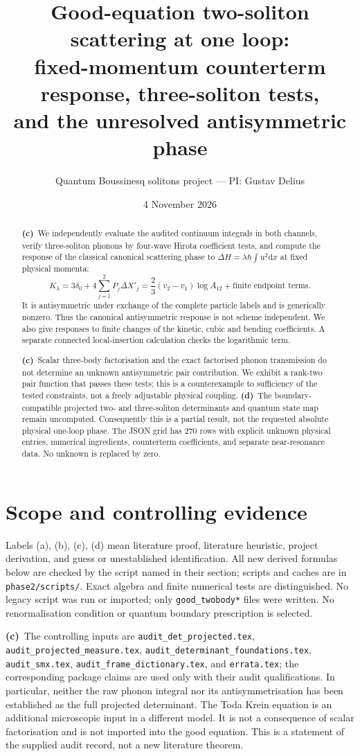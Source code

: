 \documentclass[11pt,a4paper]{article}
\title{Good-equation two-soliton scattering at one loop:\\
fixed-momentum counterterm response, three-soliton tests,\\
and the unresolved antisymmetric phase}
\author{Quantum Boussinesq solitons project --- PI: Gustav Delius}
\date{4 November 2026}
\newcommand{\Cc}{\textbf{(c)}\ }
\newcommand{\Cd}{\textbf{(d)}\ }
\newcommand{\dd}{\mathrm d}
\newcommand{\file}[1]{\nolinkurl{#1}}
\begin{document}
\maketitle
\begin{abstract}
\Cc We independently evaluate the audited continuum integrals in both
channels, verify three-soliton phonons by four-wave Hirota coefficient tests,
and compute the response of the classical canonical scattering phase to
\(\Delta H=\lambda\hbar\int u^2\dd x\) at fixed physical momenta:
\[
 K_\lambda=3\delta_0+4\sum_{j=1}^2P_j\Delta X'_j
 =\frac23(v_2-v_1)\log A_{12}+\text{finite endpoint terms}.
\]
It is antisymmetric under exchange of the complete particle labels and is
generically nonzero. Thus the canonical antisymmetric response is not
scheme independent. We also give responses to finite changes of the kinetic,
cubic and bending coefficients. A separate connected local-insertion
calculation checks the logarithmic term.

\Cc Scalar three-body factorisation and the exact factorised phonon
transmission do not determine an unknown antisymmetric pair contribution.
We exhibit a rank-two pair function that passes these tests; this is a
counterexample to sufficiency of the tested constraints, not a freely
adjustable physical coupling. \Cd The boundary-compatible projected
two- and three-soliton determinants and quantum state map remain
uncomputed. Consequently this is a partial result, not the requested
absolute physical one-loop phase. The JSON grid has 270 rows with explicit
unknown physical entries, numerical ingredients, counterterm coefficients,
and separate near-resonance data. No unknown is replaced by zero.
\end{abstract}

\section{Scope and controlling evidence}
Labels (a), (b), (c), (d) mean literature proof, literature heuristic,
project derivation, and guess or unestablished identification. All new
derived formulas below are checked by the script named in their section;
scripts and caches are in \file{phase2/scripts/}. Exact algebra and
finite numerical tests are distinguished. No legacy script was run or
imported; only \file{good_twobody*} files were written. No renormalisation
condition or quantum boundary prescription is selected.

\Cc The controlling inputs are \file{audit_det_projected.tex},
\file{audit_projected_measure.tex}, \file{audit_determinant_foundations.tex},
\file{audit_smx.tex}, \file{audit_frame_dictionary.tex}, and
\file{errata.tex}; the corresponding package claims are used only with
their audit qualifications. In particular, neither the raw phonon integral
nor its antisymmetrisation has been established as the full projected
determinant. The Toda Krein equation is an additional microscopic input in
a different model. It is not a consequence of scalar factorisation and is
not imported into the good equation. This is a statement of the supplied
audit record, not a new literature theorem.
\end{document}
